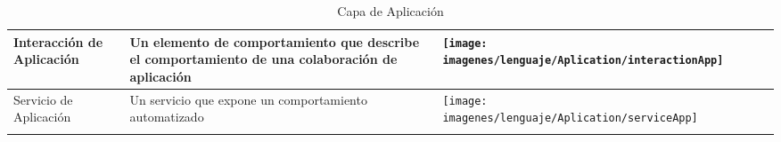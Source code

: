 \begin{center}
\begin{longtable}{| >{\centering\arraybackslash}m{3cm} | >{\arraybackslash}m{6cm} | p{4cm} | p{5cm} | p{4cm} |}
		Interacción de Aplicación &
		\vspace{1mm} Un elemento de comportamiento que describe el comportamiento de una colaboración de aplicación& 
		\texttt{[image: imagenes/lenguaje/Aplication/interactionApp]}  \\ 
		\hline 	
		
		Servicio de Aplicación &
		\vspace{1mm} Un servicio que expone un comportamiento automatizado & 
		\texttt{[image: imagenes/lenguaje/Aplication/serviceApp]} \\ 
		\hline 

		\caption{Capa de Aplicación}
		\label{capa-aplicacion}
\end{longtable}
\end{center}



